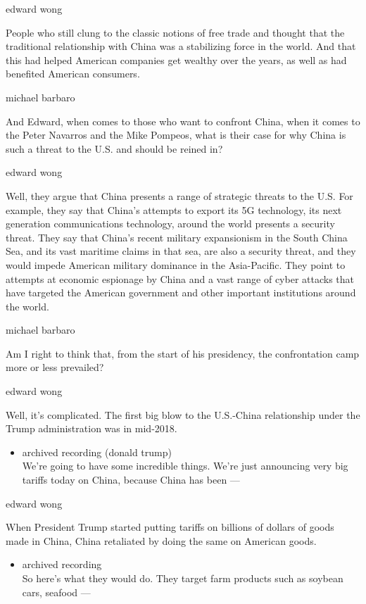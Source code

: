 edward wong

People who still clung to the classic notions of free trade and thought
that the traditional relationship with China was a stabilizing force in
the world. And that this had helped American companies get wealthy over
the years, as well as had benefited American consumers.

michael barbaro

And Edward, when comes to those who want to confront China, when it
comes to the Peter Navarros and the Mike Pompeos, what is their case for
why China is such a threat to the U.S. and should be reined in?

edward wong

Well, they argue that China presents a range of strategic threats to the
U.S. For example, they say that China's attempts to export its 5G
technology, its next generation communications technology, around the
world presents a security threat. They say that China's recent military
expansionism in the South China Sea, and its vast maritime claims in
that sea, are also a security threat, and they would impede American
military dominance in the Asia-Pacific. They point to attempts at
economic espionage by China and a vast range of cyber attacks that have
targeted the American government and other important institutions around
the world.

michael barbaro

Am I right to think that, from the start of his presidency, the
confrontation camp more or less prevailed?

edward wong

Well, it's complicated. The first big blow to the U.S.-China
relationship under the Trump administration was in mid-2018.

\begin{itemize}
\tightlist
\item
  archived recording (donald trump)\\
  We're going to have some incredible things. We're just announcing very
  big tariffs today on China, because China has been ---
\end{itemize}

edward wong

When President Trump started putting tariffs on billions of dollars of
goods made in China, China retaliated by doing the same on American
goods.

\begin{itemize}
\tightlist
\item
  archived recording\\
  So here's what they would do. They target farm products such as
  soybean cars, seafood ---
\end{itemize}

